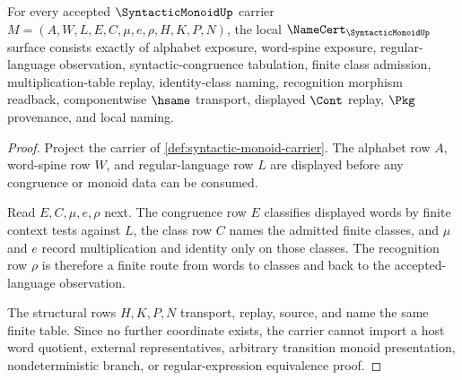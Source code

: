 \begin{theorem}
\label{thm:syntactic-monoid-namecert-obligations}
For every accepted $\SyntacticMonoidUp$ carrier $M=(A,W,L,E,C,\mu,e,\rho,H,K,P,N)$, the local $\NameCert_{\SyntacticMonoidUp}$ surface consists exactly of alphabet exposure, word-spine exposure, regular-language observation, syntactic-congruence tabulation, finite class admission, multiplication-table replay, identity-class naming, recognition morphism readback, componentwise $\hsame$ transport, displayed $\Cont$ replay, $\Pkg$ provenance, and local naming.
\end{theorem}
\begin{proof}
Project the carrier of \autoref{def:syntactic-monoid-carrier}. The alphabet row $A$, word-spine row $W$, and regular-language row $L$ are displayed before any congruence or monoid data can be consumed.

Read $E,C,\mu,e,\rho$ next. The congruence row $E$ classifies displayed words by finite context tests against $L$, the class row $C$ names the admitted finite classes, and $\mu$ and $e$ record multiplication and identity only on those classes. The recognition row $\rho$ is therefore a finite route from words to classes and back to the accepted-language observation.

The structural rows $H,K,P,N$ transport, replay, source, and name the same finite table. Since no further coordinate exists, the carrier cannot import a host word quotient, external representatives, arbitrary transition monoid presentation, nondeterministic branch, or regular-expression equivalence proof.
\end{proof}

